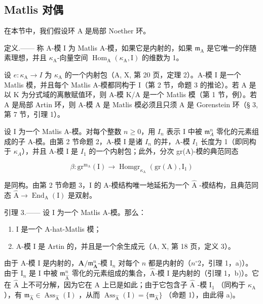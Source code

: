 \subsection{Matlis 对偶}

在本节中，我们假设环 A 是局部 Noether 环。

定义.—— 称 A-模 I 为 Matlis A-模，如果它是内射的，如果 \(\mathfrak{m}_{\mathrm{A}}\) 是它唯一的伴随素理想，并且 \(\kappa_{\mathrm{A}}\)-向量空间 \(\operatorname{Hom}_{\mathrm{A}}(\kappa_{\mathrm{A}}, \mathrm{I})\) 的维数为 1。

设 \(e: \kappa_{\mathrm{A}} \to I\) 为 \(\kappa_{\mathrm{A}}\) 的一个内射包（A, X, 第 20 页，定理 2）。A-模 I 是一个 Matlis 模，并且每个 Matlis A-模都同构于 I（第 2 节，命题 3 的推论）。若 A 是以 K 为分式域的离散赋值环，则 A-模 K/A 是一个 Matlis 模（第 1 节，例）。若 A 是局部 Artin 环，则 A-模 A 是 Matlis 模必须且只须 A 是 Gorenstein 环（§ 3, 第 7 节，引理 1）。

设 I 为一个 Matlis A-模。对每个整数 \(n \geqslant 0\)，用 \(I_n\) 表示 I 中被 \(\mathfrak{m}_A^n\) 零化的元素组成的子 A-模。由第 2 节命题 2，A-模 I 是诸 \(I_n\) 的并，A-模 \(I_1\) 长度为 1（即同构于 \(\kappa_A\)），并且 A-模 I 是 \(I_1\) 的一个内射包；此外，分次 gr(A)-模的典范同态

\[
\beta : \mathrm{gr} ^ {\mathrm{m} _ {\mathrm{A}}} (\mathrm{I}) \longrightarrow \operatorname{Homgr} _ {\kappa_ {\mathrm{A}}} (\mathrm{gr} (\mathrm{A}), \mathrm{I} _ {1})\tag{3}
\]

是同构。由第 2 节命题 3，I 的 A-模结构唯一地延拓为一个 \(\widehat{\mathrm{A}}\) -模结构，且典范同态 \(\widehat{\mathrm{A}} \to \operatorname{End}_{\mathrm{A}}(\mathrm{I})\) 是双射。

引理 3.—— 设 I 为一个 Matlis A-模。那么：

\begin{enumerate}
\def\labelenumi{\alph{enumi})}
\item
  I 是一个 A-hat-Matlis 模；
\item
  A-模 I 是 Artin 的，并且是一个余生成元（A, X, 第 18 页，定义 3）。
\end{enumerate}

由于 A-模 I 是内射的，\(\mathbf{A} / \mathfrak{m}_{\mathbf{A}}^{n}\)-模 \(\mathrm{I}_n\) 对每个 \(n\) 都是内射的（\(n^{\circ}2\)，引理 1，a)）。由于 \(\mathrm{I}_n\) 是 I 中被 \(\mathfrak{m}_{\widehat{\mathrm{A}}}^{n}\) 零化的元素组成的集合，\(\widehat{\mathrm{A}}\)-模 I 是内射的（引理 1，b)）。它在 \(\widehat{\mathrm{A}}\) 上不可分解，因为它在 \(\mathrm{A}\) 上已是如此；由于它包含子 \(\widehat{\mathrm{A}}\) -模 \(\mathrm{I}_1\) （同构于 \(\kappa_{\mathrm{A}}\) ），有 \(\mathfrak{m}_{\widehat{\mathrm{A}}} \in \operatorname{Ass}_{\widehat{\mathrm{A}}}(\mathrm{I})\) ，从而 \(\operatorname{Ass}_{\widehat{\mathrm{A}}}(\mathrm{I}) = \{\mathfrak{m}_{\widehat{\mathrm{A}}}\}\) （命题 1），由此得 a)。

